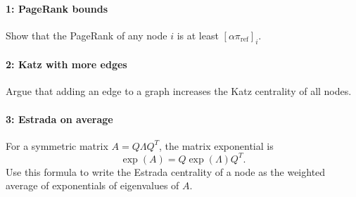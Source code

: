 \documentclass[12pt, leqno]{article} %
\begin{document}

\paragraph*{1: PageRank bounds}
Show that the PageRank of any node $i$ is at least
$[\alpha \pi_{\mathrm{ref}}]_{i}$.

\paragraph*{2: Katz with more edges}
Argue that adding an edge to a graph increases the Katz centrality of
all nodes.

\paragraph*{3: Estrada on average}
For a symmetric matrix $A = Q \Lambda Q^T$, the matrix exponential is
\[
  \exp(A) = Q \exp(\Lambda) Q^T.
\]
Use this formula to write the Estrada centrality of a node as the
weighted average of exponentials of eigenvalues of $A$.
\end{document}
